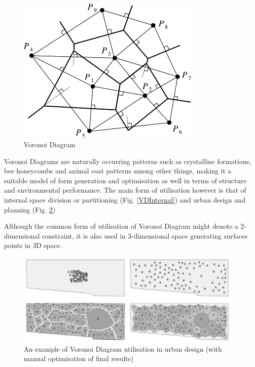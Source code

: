 \begin{figure}[htbp]
\centering
\includegraphics[width=0.8\textwidth]{./Images/6-VoronoiDiagram}
\caption[Voronoi Diagram]{Voronoi Diagram \cite{fujita00}}
\label{VDiag}
\end{figure}

Voronoi Diagrams are naturally occurring patterns such as crystalline formations, bee honeycombs and animal coat patterns among other things, making it a suitable model of form generation and optimisation as well in terms of structure \cite{friedrich08} and environmental performance\label{NaturalOpt}. The main form of utilisation however is that of internal space division or partitioning (Fig. \ref{VDInternal}) and urban design and planning (Fig. \ref{VDUrban})

Although the common form of utilisation of Voronoi Diagram might denote a 2-dimensional constraint, it is also used in 3-dimensional space generating surfaces points in 3D space.

\begin{figure}[htbp]
\centering
\includegraphics[width=\textwidth]{./Images/7-UrbanVoronoi}
\caption[Voronoi Diagram and Urban Design]{An example of Voronoi Diagram utilisation in urban design (with manual optimisation of final results) \cite{friedrich08}}
\label{VDUrban}
\end{figure}

